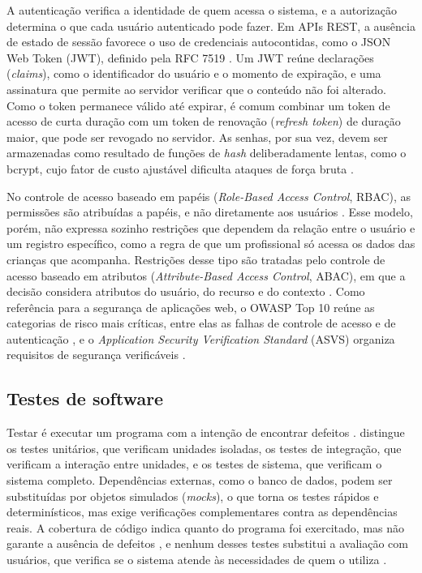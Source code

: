 A autenticação verifica a identidade de quem acessa o sistema, e a autorização determina o que cada usuário autenticado pode fazer. Em APIs REST, a ausência de estado de sessão favorece o uso de credenciais autocontidas, como o JSON Web Token (JWT), definido pela RFC 7519 \cite{rfc7519_jwt}. Um JWT reúne declarações (\textit{claims}), como o identificador do usuário e o momento de expiração, e uma assinatura que permite ao servidor verificar que o conteúdo não foi alterado. Como o token permanece válido até expirar, é comum combinar um token de acesso de curta duração com um token de renovação (\textit{refresh token}) de duração maior, que pode ser revogado no servidor. As senhas, por sua vez, devem ser armazenadas como resultado de funções de \textit{hash} deliberadamente lentas, como o bcrypt, cujo fator de custo ajustável dificulta ataques de força bruta \cite{provos1999_bcrypt}.

No controle de acesso baseado em papéis (\textit{Role-Based Access Control}, RBAC), as permissões são atribuídas a papéis, e não diretamente aos usuários \cite{sandhu1996_rbac}. Esse modelo, porém, não expressa sozinho restrições que dependem da relação entre o usuário e um registro específico, como a regra de que um profissional só acessa os dados das crianças que acompanha. Restrições desse tipo são tratadas pelo controle de acesso baseado em atributos (\textit{Attribute-Based Access Control}, ABAC), em que a decisão considera atributos do usuário, do recurso e do contexto \cite{hu2014_abac}. Como referência para a segurança de aplicações web, o OWASP Top 10 reúne as categorias de risco mais críticas, entre elas as falhas de controle de acesso e de autenticação \cite{owasp2021_top10}, e o \textit{Application Security Verification Standard} (ASVS) organiza requisitos de segurança verificáveis \cite{owasp2025_asvs}.

\subsection{Testes de software}\label{sec:fund_testes}

Testar é executar um programa com a intenção de encontrar defeitos \cite{myers2011_art_testing}.  distingue os testes unitários, que verificam unidades isoladas, os testes de integração, que verificam a interação entre unidades, e os testes de sistema, que verificam o sistema completo. Dependências externas, como o banco de dados, podem ser substituídas por objetos simulados (\textit{mocks}), o que torna os testes rápidos e determinísticos, mas exige verificações complementares contra as dependências reais. A cobertura de código indica quanto do programa foi exercitado, mas não garante a ausência de defeitos \cite{myers2011_art_testing}, e nenhum desses testes substitui a avaliação com usuários, que verifica se o sistema atende às necessidades de quem o utiliza \cite{sommerville2018_engenharia_software}.

